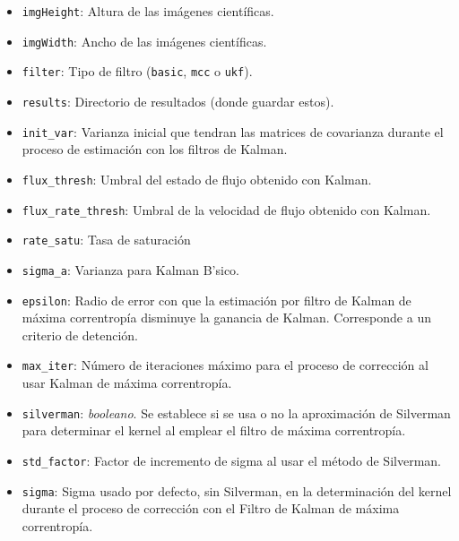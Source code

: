 \begin{itemize}
\item \texttt{imgHeight}: Altura de las im\'agenes cient\'ificas.
\item \texttt{imgWidth}: Ancho de las im\'agenes cient\'ificas.
\item \texttt{filter}: Tipo de filtro (\texttt{basic}, \texttt{mcc} o \texttt{ukf}).
\item \texttt{results}: Directorio de resultados (donde guardar estos).
\item \texttt{init\_var}: Varianza inicial que tendran las matrices de covarianza durante el proceso de estimaci\'on con los filtros de Kalman. 
\item \texttt{flux\_thresh}: Umbral del estado de flujo obtenido con Kalman. 
\item \texttt{flux\_rate\_thresh}: Umbral de la velocidad de flujo obtenido con Kalman.
\item \texttt{rate\_satu}: Tasa de saturaci\'on 
\item \texttt{sigma\_a}: Varianza para Kalman B\a'sico.
\item \texttt{epsilon}: Radio de error con que la estimaci\'on por filtro de Kalman de m\'axima correntrop\'ia disminuye la ganancia de Kalman. Corresponde a un criterio de detenci\'on.
\item \texttt{max\_iter}: N\'umero de iteraciones m\'aximo para el proceso de correcci\'on al usar Kalman de m\'axima correntrop\'ia. 
\item \texttt{silverman}: \textit{booleano}. Se establece si se usa o no la aproximaci\'on de Silverman para determinar el kernel al emplear el filtro de m\'axima correntrop\'ia.
\item \texttt{std\_factor}: Factor de incremento de sigma al usar el m\'etodo de Silverman.
\item \texttt{sigma}: Sigma usado por defecto, sin Silverman, en la determinaci\'on del kernel durante el proceso de correcci\'on con el Filtro de Kalman de m\'axima correntrop\'ia.
\end{itemize}


